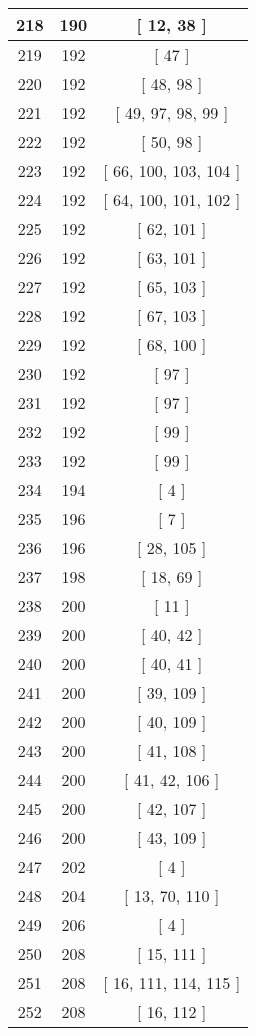 \begin{center}
\begin{longtable}[H]{|| c c c ||}
\hline
218 & 190 & [ 12, 38 ] \\ 
\hline
219 & 192 & [ 47 ] \\ 
\hline
220 & 192 & [ 48, 98 ] \\ 
\hline
221 & 192 & [ 49, 97, 98, 99 ] \\ 
\hline
222 & 192 & [ 50, 98 ] \\ 
\hline
223 & 192 & [ 66, 100, 103, 104 ] \\ 
\hline
224 & 192 & [ 64, 100, 101, 102 ] \\ 
\hline
225 & 192 & [ 62, 101 ] \\ 
\hline
226 & 192 & [ 63, 101 ] \\ 
\hline
227 & 192 & [ 65, 103 ] \\ 
\hline
228 & 192 & [ 67, 103 ] \\ 
\hline
229 & 192 & [ 68, 100 ] \\ 
\hline
230 & 192 & [ 97 ] \\ 
\hline
231 & 192 & [ 97 ] \\ 
\hline
232 & 192 & [ 99 ] \\ 
\hline
233 & 192 & [ 99 ] \\ 
\hline
234 & 194 & [ 4 ] \\ 
\hline
235 & 196 & [ 7 ] \\ 
\hline
236 & 196 & [ 28, 105 ] \\ 
\hline
237 & 198 & [ 18, 69 ] \\ 
\hline
238 & 200 & [ 11 ] \\ 
\hline
239 & 200 & [ 40, 42 ] \\ 
\hline
240 & 200 & [ 40, 41 ] \\ 
\hline
241 & 200 & [ 39, 109 ] \\ 
\hline
242 & 200 & [ 40, 109 ] \\ 
\hline
243 & 200 & [ 41, 108 ] \\ 
\hline
244 & 200 & [ 41, 42, 106 ] \\ 
\hline
245 & 200 & [ 42, 107 ] \\ 
\hline
246 & 200 & [ 43, 109 ] \\ 
\hline
247 & 202 & [ 4 ] \\ 
\hline
248 & 204 & [ 13, 70, 110 ] \\ 
\hline
249 & 206 & [ 4 ] \\ 
\hline
250 & 208 & [ 15, 111 ] \\ 
\hline
251 & 208 & [ 16, 111, 114, 115 ] \\ 
\hline
252 & 208 & [ 16, 112 ] \\ 

\end{longtable}
\end{center}

